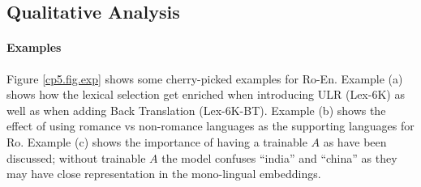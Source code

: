



\subsection{Qualitative Analysis}
\paragraph{Examples} Figure \ref{cp5.fig.exp} shows some cherry-picked examples for Ro-En. Example (a) shows how the lexical selection get enriched when introducing ULR (Lex-6K) as well as when adding Back Translation (Lex-6K-BT). Example (b) shows the effect of using romance vs non-romance languages as the supporting languages for Ro. Example (c) shows the importance of having a trainable $A$ as have been discussed; without trainable $A$ the model confuses ``india'' and ``china'' as they may have  close representation in the mono-lingual embeddings.


